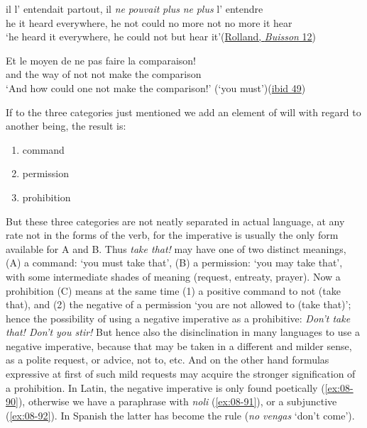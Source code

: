 \ea \label{ex:08-88}
\gll il l' entendait partout, il \emph{ne} \emph{pouvait} \emph{plus} \emph{ne} \emph{plus} l' entendre\\
 he it heard everywhere, he not could {no more} not {no more} it hear\\
\glt `he heard it everywhere, he could not but hear it'\hfill(\href{https://fr.wikisource.org/wiki/Page%3ARolland_-_Jean-Christophe%2C_tome_9.djvu/28}{Rolland, \textit{Buisson} 12}) %
\z

\ea \label{ex:08-89}
\gll Et le moyen de ne pas faire la comparaison!\\
 and the way of not not make the comparison\\
\glt `And how could one not make the comparison!' \phantom{x} (`you must')\hfill(\href{https://fr.wikisource.org/wiki/Page%3ARolland_-_Jean-Christophe%2C_tome_8.djvu/59}{ibid 49})
\z
{}

If to the three categories just mentioned we add an element of will with regard to another being, the result is: 

\begin{enumerate}[label=\Alph*., noitemsep]
\item command
\item permission
\item prohibition
\end{enumerate}

But these three categories are not neatly separated in actual language, at any rate not in the forms of the verb, for the imperative is usually the only form available for A and B. Thus \textit{take that!} may have one of two distinct meanings, (A) a command: `you must take that', (B) a permission: `you may take that', with some intermediate shades of meaning (request, entreaty, prayer). Now a prohibition (C) means at the same time (1) a positive command to not (take that), and (2) the negative of a permission `you are not allowed to (take that)'; hence the possibility of using a negative imperative as a prohibitive: \textit{Don't take that! Don't you stir!} But hence also the disinclination in many languages to use a negative imperative, because that may be taken in a different and milder sense, as a polite request, or advice, not to, etc. And on the other hand formulas expressive at first of such mild requests may acquire the stronger signification of a prohibition. In Latin, the negative imperative is only found poetically (\ref{ex:08-90}), otherwise we have a paraphrase with \textit{noli} (\ref{ex:08-91}), or a subjunctive (\ref{ex:08-92}). In Spanish the latter has become the rule (\textit{no vengas} `don't come').

